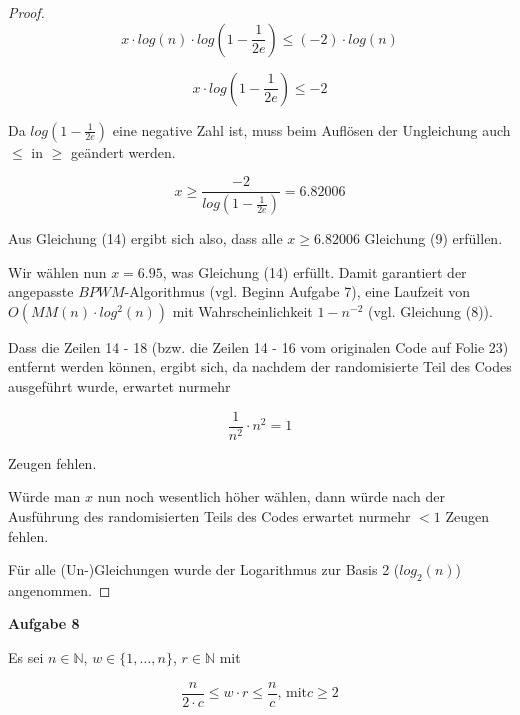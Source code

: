 \documentclass{article}
\begin{document}
\begin{proof}
  \begin{equation}
    x \cdot log \left( n \right) \cdot log \left( 1 - \frac{1}{2e} \right) \leq (-2) \cdot log \left( n \right)
  \end{equation}

  \begin{equation}
    x \cdot log \left( 1 - \frac{1}{2e} \right) \leq -2
  \end{equation}

  Da $log \left( 1 - \frac{1}{2e} \right)$ eine negative Zahl ist, muss beim
  Aufl{\"o}sen der Ungleichung auch $\leq$ in $\geq$ ge{\"a}ndert werden.

  \begin{equation}
    x \geq \frac{-2}{log \left( 1 - \frac{1}{2e} \right)} = 6.82006
  \end{equation}

  Aus Gleichung (14) ergibt sich also, dass alle $x \geq 6.82006$ Gleichung (9)
  erf{\"u}llen.

  Wir w{\"a}hlen nun $x = 6.95$, was Gleichung (14) erf{\"u}llt. \newline
  Damit garantiert der angepasste $BPWM$-Algorithmus (vgl. Beginn Aufgabe 7),
  eine Laufzeit von $O \left( MM \left( n \right) \cdot log^2(n) \right)$ mit
  Wahrscheinlichkeit $1 - n^{-2}$  (vgl. Gleichung (8)).

  Dass die Zeilen 14 - 18 (bzw. die Zeilen 14 - 16 vom originalen Code auf Folie
  23) entfernt werden k{\"o}nnen, ergibt sich, da nachdem der randomisierte
  Teil des Codes ausgef{\"u}hrt wurde, erwartet nurmehr

  \begin{equation}
    \frac{1}{n^2} \cdot n^2 = 1
  \end{equation}

  Zeugen fehlen.

  W{\"u}rde man $x$ nun noch wesentlich h{\"o}her w{\"a}hlen, dann w{\"u}rde
  nach der Ausf{\"u}hrung des randomisierten Teils des Codes erwartet nurmehr
  $< 1$ Zeugen fehlen.

  F{\"u}r alle (Un-)Gleichungen wurde der Logarithmus zur Basis 2 ($log_2(n)$)
  angenommen.
\end{proof}

\newpage
{\noindent\bfseries Aufgabe 8}%
\medskip%

\noindent
Es sei $n \in \mathbb{N}$, $w \in \{ 1, \ldots, n \}$, $r \in \mathbb{N}$ mit

\begin{equation}
  \frac{n}{2 \cdot c} \leq w \cdot r \leq \frac{n}{c}\text{, mit} c \geq 2
\end{equation}
\end{document}
